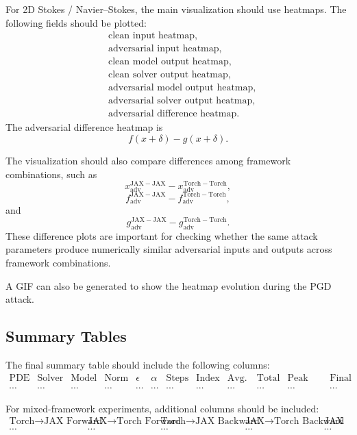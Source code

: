 \documentclass{article}
\begin{document}
For 2D Stokes / Navier--Stokes, the main visualization should use heatmaps. The following fields should be plotted:
\[
\begin{aligned}
&\text{clean input heatmap},\\
&\text{adversarial input heatmap},\\
&\text{clean model output heatmap},\\
&\text{clean solver output heatmap},\\
&\text{adversarial model output heatmap},\\
&\text{adversarial solver output heatmap},\\
&\text{adversarial difference heatmap}.
\end{aligned}
\]
The adversarial difference heatmap is
\[
f(x+\delta)-g(x+\delta).
\]

The visualization should also compare differences among framework combinations, such as
\[
x_{\mathrm{adv}}^{\mathrm{JAX-JAX}}
-
x_{\mathrm{adv}}^{\mathrm{Torch-Torch}},
\]
\[
f_{\mathrm{adv}}^{\mathrm{JAX-JAX}}
-
f_{\mathrm{adv}}^{\mathrm{Torch-Torch}},
\]
and
\[
g_{\mathrm{adv}}^{\mathrm{JAX-JAX}}
-
g_{\mathrm{adv}}^{\mathrm{Torch-Torch}}.
\]
These difference plots are important for checking whether the same attack parameters produce numerically similar adversarial inputs and outputs across framework combinations.

A GIF can also be generated to show the heatmap evolution during the PGD attack.

\subsection{Summary Tables}

The final summary table should include the following columns:
\[
\begin{array}{c|c|c|c|c|c|c|c|c|c|c|c}
\text{PDE Case}
&
\text{Solver}
&
\text{Model}
&
\text{Norm}
&
\epsilon
&
\alpha
&
\text{Steps}
&
\text{Index}
&
\text{Avg. Step Time}
&
\text{Total Time}
&
\text{Peak Memory}
&
\text{Final True Loss}
\\
\hline
\cdots & \cdots & \cdots & \cdots & \cdots & \cdots & \cdots & \cdots & \cdots & \cdots & \cdots & \cdots
\end{array}
\]

For mixed-framework experiments, additional columns should be included:
\[
\begin{array}{c|c|c|c|c}
\text{Torch} \rightarrow \text{JAX Forward}
&
\text{JAX} \rightarrow \text{Torch Forward}
&
\text{Torch} \rightarrow \text{JAX Backward}
&
\text{JAX} \rightarrow \text{Torch Backward}
&
\text{JAX VJP Time}
\\
\hline
\cdots & \cdots & \cdots & \cdots & \cdots
\end{array}
\]
\end{document}
